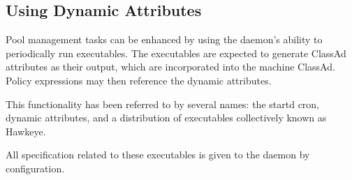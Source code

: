\subsection{\label{sec:Dynamic-Attributes}Using Dynamic Attributes}

Pool management tasks can be enhanced by using the 
daemon's ability to periodically run executables.
The executables are expected to generate ClassAd attributes as their output,
which are incorporated into the machine ClassAd.
Policy expressions may then reference the dynamic attributes.

This functionality has been referred to by several names:
the startd cron, dynamic attributes,
and a distribution of executables collectively known as Hawkeye.

All specification related to these executables is given to the
 daemon by configuration.

\MoreTodo
